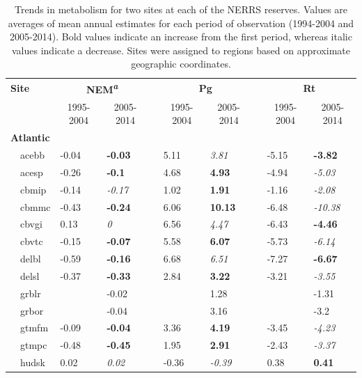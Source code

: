 \documentclass[10pt,letterpaper]{article}\usepackage[]{graphicx}\usepackage[]{color}
\begin{document}
\begin{table}[!tbp]
{\footnotesize
\caption{Trends in metabolism for two sites at each of the \ac{NERRS} reserves.  Values are averages of mean annual estimates for each period of observation (1994-2004 and 2005-2014). Bold values indicate an increase from the first period, whereas italic values indicate a decrease. Sites were assigned to regions based on approximate geographic coordinates.\label{tab:metab_tab}} 
\begin{center}
\begin{tabular}{lllcllcll}
\hline\hline
\multicolumn{1}{l}{\bfseries Site}&\multicolumn{2}{c}{\bfseries NEM\textsuperscript{{\it a}}}&\multicolumn{1}{c}{\bfseries }&\multicolumn{2}{c}{\bfseries Pg}&\multicolumn{1}{c}{\bfseries }&\multicolumn{2}{c}{\bfseries Rt}\tabularnewline
\cline{2-3} \cline{5-6} \cline{8-9}
\multicolumn{1}{l}{}&\multicolumn{1}{c}{1995-2004}&\multicolumn{1}{c}{2005-2014}&\multicolumn{1}{c}{}&\multicolumn{1}{c}{1995-2004}&\multicolumn{1}{c}{2005-2014}&\multicolumn{1}{c}{}&\multicolumn{1}{c}{1995-2004}&\multicolumn{1}{c}{2005-2014}\tabularnewline
\hline
{\bfseries Atlantic}&&&&&&&&\tabularnewline
~~acebb&-0.04&{\bf -0.03}&&5.11&{\it 3.81}&&-5.15&{\bf -3.82}\tabularnewline
~~acesp&-0.26&{\bf -0.1}&&4.68&{\bf 4.93}&&-4.94&{\it -5.03}\tabularnewline
~~cbmip&-0.14&{\it -0.17}&&1.02&{\bf 1.91}&&-1.16&{\it -2.08}\tabularnewline
~~cbmmc&-0.43&{\bf -0.24}&&6.06&{\bf 10.13}&&-6.48&{\it -10.38}\tabularnewline
~~cbvgi&0.13&{\it 0}&&6.56&{\it 4.47}&&-6.43&{\bf -4.46}\tabularnewline
~~cbvtc&-0.15&{\bf -0.07}&&5.58&{\bf 6.07}&&-5.73&{\it -6.14}\tabularnewline
~~delbl&-0.59&{\bf -0.16}&&6.68&{\it 6.51}&&-7.27&{\bf -6.67}\tabularnewline
~~delsl&-0.37&{\bf -0.33}&&2.84&{\bf 3.22}&&-3.21&{\it -3.55}\tabularnewline
~~grblr&&-0.02&&&1.28&&&-1.31\tabularnewline
~~grbor&&-0.04&&&3.16&&&-3.2\tabularnewline
~~gtmfm&-0.09&{\bf -0.04}&&3.36&{\bf 4.19}&&-3.45&{\it -4.23}\tabularnewline
~~gtmpc&-0.48&{\bf -0.45}&&1.95&{\bf 2.91}&&-2.43&{\it -3.37}\tabularnewline
~~hudsk&0.02&{\it 0.02}&&-0.36&{\it -0.39}&&0.38&{\bf 0.41}\tabularnewline

\end{tabular}
\end{center}}
\end{table}
\end{document}

